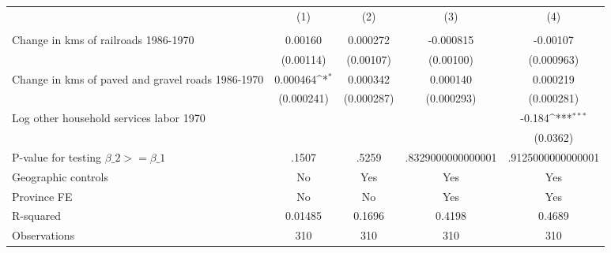 {
\def\sym#1{\ifmmode^{#1}\else\(^{#1}\)\fi}
\begin{tabular}{l*{4}{c}}
\hline\hline
                &\multicolumn{1}{c}{(1)}&\multicolumn{1}{c}{(2)}&\multicolumn{1}{c}{(3)}&\multicolumn{1}{c}{(4)}\\
                &\multicolumn{1}{c}{}&\multicolumn{1}{c}{}&\multicolumn{1}{c}{}&\multicolumn{1}{c}{}\\
\hline
Change in kms of railroads 1986-1970&  0.00160         & 0.000272         &-0.000815         & -0.00107         \\
                &(0.00114)         &(0.00107)         &(0.00100)         &(0.000963)         \\
[1em]
Change in kms of paved and gravel roads 1986-1970& 0.000464\sym{*}  & 0.000342         & 0.000140         & 0.000219         \\
                &(0.000241)         &(0.000287)         &(0.000293)         &(0.000281)         \\
[1em]
Log other household services labor 1970&                  &                  &                  &   -0.184\sym{***}\\
                &                  &                  &                  & (0.0362)         \\
\hline
P-value for testing $\beta\_{2} >= \beta\_{1}$&    .1507         &    .5259         &.8329000000000001         &.9125000000000001         \\
Geographic controls&       No         &      Yes         &      Yes         &      Yes         \\
Province FE     &       No         &       No         &      Yes         &      Yes         \\
R-squared       &  0.01485         &   0.1696         &   0.4198         &   0.4689         \\
Observations    &      310         &      310         &      310         &      310         \\
\hline\hline
\end{tabular}
}
